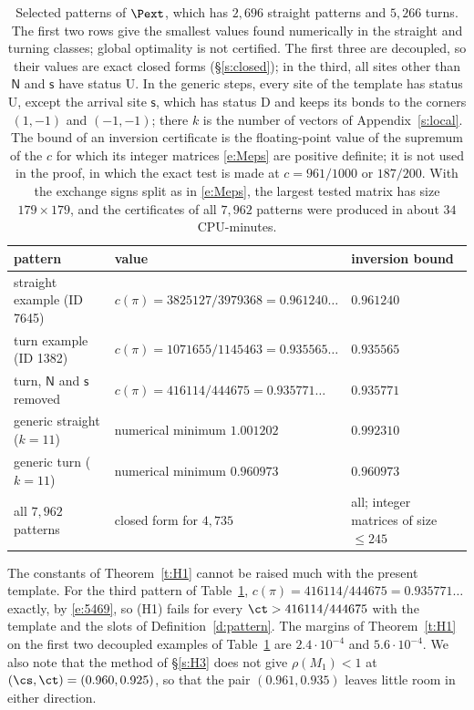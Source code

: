 \begin{table}[ht]
\centering
\small
\begin{tabular}{lll}
pattern & value & inversion bound \\ \hline
straight example (ID 7645) & $c(\pi) = 3825127/3979368 = 0.961240\ldots$ & $0.961240$ \\
turn example (ID 1382) & $c(\pi) = 1071655/1145463 = 0.935565\ldots$ & $0.935565$ \\
turn, $\mathsf N$ and $\mathsf s$ removed & $c(\pi) = 416114/444675 = 0.935771\ldots$ & $0.935771$ \\
generic straight ($k = 11$) & numerical minimum $1.001202$ & $0.992310$ \\
generic turn ($k = 11$) & numerical minimum $0.960973$ & $0.960973$ \\ \hline
all $7{,}962$ patterns & closed form for $4{,}735$ & all; integer matrices of size $\le 245$
\end{tabular}
\caption{Selected patterns of $\Pext$, which has $2{,}696$ straight patterns and $5{,}266$ turns. The first two rows give the smallest values found numerically in the straight and turning classes; global optimality is not certified. The first three are decoupled, so their values are exact closed forms (\S\ref{s:closed}); in the third, all sites other than $\mathsf N$ and $\mathsf s$ have status $\mathrm U$. In the generic steps, every site of the template has status $\mathrm U$, except the arrival site $\mathsf s$, which has status $\mathrm D$ and keeps its bonds to the corners $(1, -1)$ and $(-1, -1)$; there $k$ is the number of vectors of Appendix~\ref{s:local}. The bound of an inversion certificate is the floating-point value of the supremum of the $c$ for which its integer matrices \eqref{e:Meps} are positive definite; it is not used in the proof, in which the exact test is made at $c = 961/1000$ or $187/200$. With the exchange signs split as in \eqref{e:Meps}, the largest tested matrix has size $179 \times 179$, and the certificates of all $7{,}962$ patterns were produced in about $34$ CPU-minutes.}\label{tab:H1}
\end{table}

\begin{remark}\label{r:H1sharp}
The constants of Theorem~\ref{t:H1} cannot be raised much with the present template. For the third pattern of Table~\ref{tab:H1}, $c(\pi) = 416114/444675 = 0.935771\ldots$ exactly, by \eqref{e:5469}, so (H1) fails for every $\ct > 416114/444675$ with the template and the slots of Definition~\ref{d:pattern}. The margins of Theorem~\ref{t:H1} on the first two decoupled examples of Table~\ref{tab:H1} are $2.4 \cdot 10^{-4}$ and $5.6 \cdot 10^{-4}$. We also note that the method of \S\ref{s:H3} does not give $\rho(M_1) < 1$ at $(\cs, \ct) = (0.960, 0.925)$, so that the pair $(0.961, 0.935)$ leaves little room in either direction.
\end{remark}
